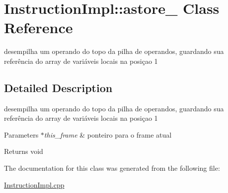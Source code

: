 \hypertarget{class_instruction_impl_1_1astore__1}{}\section{Instruction\+Impl\+:\+:astore\+\_ Class Reference}
\label{class_instruction_impl_1_1astore__1}


desempilha um operando do topo da pilha de operandos, guardando sua referência do array de variáveis locais na posiçao 1  




\subsection{Detailed Description}
desempilha um operando do topo da pilha de operandos, guardando sua referência do array de variáveis locais na posiçao 1 


\begin{DoxyParams}{Parameters}
{\em $\ast$this\+\_\+frame} & ponteiro para o frame atual \\
\hline
\end{DoxyParams}
\begin{DoxyReturn}{Returns}
void 
\end{DoxyReturn}


The documentation for this class was generated from the following file\+:\begin{DoxyCompactItemize}
\item 
\hyperlink{_instruction_impl_8cpp}{Instruction\+Impl.\+cpp}\end{DoxyCompactItemize}
